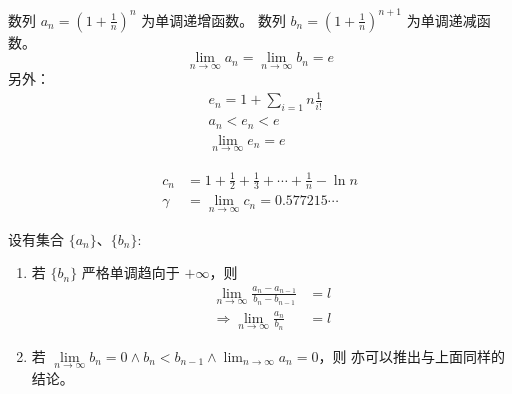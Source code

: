 \begin{exposition}[自然常数 $e$]    
    数列 $a_n = (1+\frac{1}{n})^n$ 为单调递增函数。
    数列 $b_n = (1+\frac{1}{n})^{n+1}$ 为单调递减函数。
    \begin{equation}
        \lim_{n \to \infty}{a_n} = \lim_{n \to \infty}{b_n} = e
    \end{equation}
    另外：
    \begin{align*}
        &e_n = 1 + \sum_{i=1}{n}{\frac{1}{i!}} \\
        &a_n < e_n < e \\
        &\lim_{n \to \infty}{e_n} = e
    \end{align*}
\end{exposition}

\begin{exposition}[欧拉常数]
    \begin{align*}
        c_n &= 1 + \frac12 + \frac13 + \cdots + \frac1n - \ln{n}\\
        \gamma &= \lim_{n \to \infty}{c_n} = 0.577215\cdots
    \end{align*}
\end{exposition}

\begin{exposition}[stolz 公式]
    设有集合 $\{a_n\}$、$\{b_n\}$:
    \begin{enumerate}
        \item 若 $\{b_n\}$ 严格单调趋向于 $+\infty$，则
            \begin{align*}
                \lim_{n \to \infty}{\frac{a_n - a_{n-1}}{b_n - b_{n-1}}} &= l \\
                \Rightarrow \lim_{n \to \infty}{\frac{a_n}{b_n}} &= l
            \end{align*}
        \item 若 $\lim \limits_{n \to \infty}{b_n} = 0 \land b_n < b_{n-1} \land \lim_{n \to \infty}{a_n} = 0$，则
            亦可以推出与上面同样的结论。
    \end{enumerate}
\end{exposition}